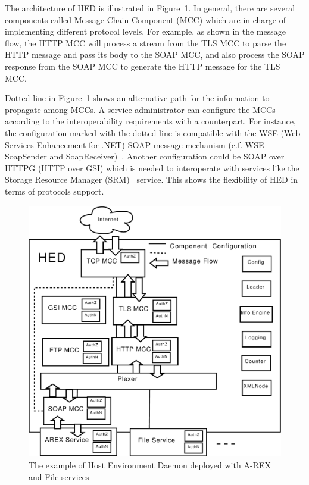 \documentclass[conference]{IEEEtran}
\begin{document}
The architecture of HED is illustrated in Figure~\ref{fig:HED}. In general, there 
are several components called Message Chain Component (MCC) which are in charge of implementing 
different protocol levels. For example, as shown in the message flow, the HTTP MCC 
will process a stream from the TLS MCC to parse the HTTP message and pass its body to the SOAP 
MCC, and also process the SOAP response from the SOAP MCC to generate the HTTP message 
for the TLS MCC.

Dotted line in Figure~\ref{fig:HED} shows an alternative path for the information 
to propagate among MCCs. A service administrator can configure the MCCs according to the 
interoperability requirements with a counterpart. For instance, the configuration marked 
with the dotted line is compatible with the WSE (Web Services Enhancement for .NET) SOAP 
message mechanism (c.f. WSE SoapSender and SoapReceiver)~\cite{WSElink}. Another configuration 
could be SOAP over HTTPG (HTTP over GSI) which is needed to interoperate with services 
like the Storage Resource Manager (SRM)~\cite{A.Shoshan03} service. This shows the 
flexibility of HED in terms of protocols support.

\begin{figure}
\includegraphics[width=0.9\columnwidth]{HED.pdf}
\caption{The example of Host Environment Daemon deployed with A-REX and File services}
\label{fig:HED}
\end{figure}
\end{document}
